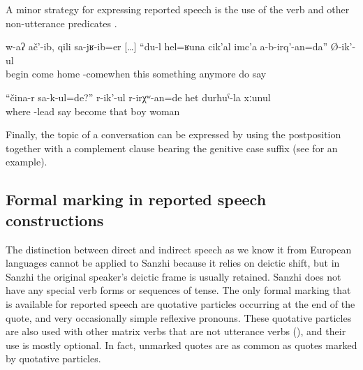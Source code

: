 A minor strategy for expressing reported speech is the use of the verb   and other non-utterance predicates .
%
\begin{exe}
	\ex	\label{ex:He began when he came home, I will not anymore do things like this}
	\gll	w-aʔ	ač'-ib,	qili	sa-jʁ-ib=er	[\ldots]	``du-l	hel=ʁuna	cik'al	imc'a	a-b-irq'-an=da''	Ø-ik'-ul\\
		begin	come	home	-comewhen	{}		this something	anymore	do	say\\
	\glt	{}

	\ex	\label{ex:‎‎‎The daughter-in-law must have asked, From where do you bring the body}
	\gll	``čina-r	sa-k-ul=de?''	r-ik'-ul	r-irχʷ-an=de	het	durħuˁ-la	xːunul	\\
		where	-lead	say	become	that	boy	woman\\
	\glt	{}
\end{exe}

Finally, the topic of a conversation can be expressed by using the postposition   together with a complement clause bearing the genitive case suffix (see  for an example).



\subsection{Formal marking in reported speech constructions}
\label{ssec:Formal marking in reported speech constructions}

The distinction between direct and indirect speech as we know it from European languages cannot be applied to Sanzhi because it relies on deictic shift, but in Sanzhi the original speaker's deictic frame is usually retained. Sanzhi does not have any special verb forms or sequences of tense. The only formal marking that is available for reported speech are quotative particles occurring at the end of the quote, and very occasionally simple reflexive pronouns. These quotative particles are also used with other matrix verbs that are not utterance verbs (), and their use is mostly optional. In fact, unmarked quotes are as common as quotes marked by quotative particles.


